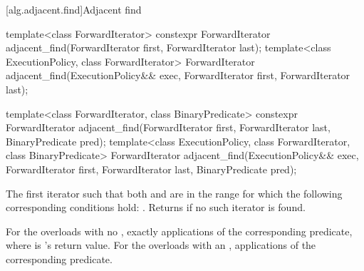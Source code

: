 [alg.adjacent.find]{Adjacent find}

%
\begin{itemdecl}
template<class ForwardIterator>
  constexpr ForwardIterator
    adjacent_find(ForwardIterator first, ForwardIterator last);
template<class ExecutionPolicy, class ForwardIterator>
  ForwardIterator
    adjacent_find(ExecutionPolicy&& exec,
                  ForwardIterator first, ForwardIterator last);

template<class ForwardIterator, class BinaryPredicate>
  constexpr ForwardIterator
    adjacent_find(ForwardIterator first, ForwardIterator last,
                  BinaryPredicate pred);
template<class ExecutionPolicy, class ForwardIterator, class BinaryPredicate>
  ForwardIterator
    adjacent_find(ExecutionPolicy&& exec,
                  ForwardIterator first, ForwardIterator last,
                  BinaryPredicate pred);
\end{itemdecl}

\begin{itemdescr}
\pnum
\returns
The first iterator
such that both
and
are in
the range
for which
the following corresponding conditions hold:
.
Returns 
if no such iterator is found.

\pnum
\complexity
For the overloads with no , exactly
applications of the corresponding predicate, where  is
's
return value.  For the overloads with an ,
 applications of the corresponding predicate.
\end{itemdescr}


